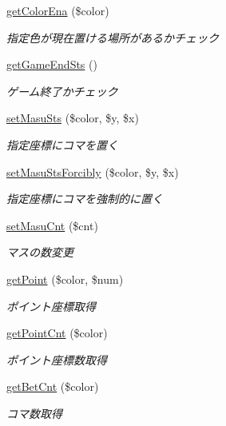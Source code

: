 \begin{DoxyCompactItemize}
\hyperlink{class_reversi_aead5ee041feb6ac2609266614ea06f78}{get\+Color\+Ena} (\$color)
\begin{DoxyCompactList}\small\item\em 指定色が現在置ける場所があるかチェック \end{DoxyCompactList}\item 
\hyperlink{class_reversi_aab9985c789e464de6cf99d7d725cb5a3}{get\+Game\+End\+Sts} ()
\begin{DoxyCompactList}\small\item\em ゲーム終了かチェック \end{DoxyCompactList}\item 
\hyperlink{class_reversi_a26f3168c7d94e70d344841d65885a4ac}{set\+Masu\+Sts} (\$color, \$y, \$x)
\begin{DoxyCompactList}\small\item\em 指定座標にコマを置く \end{DoxyCompactList}\item 
\hyperlink{class_reversi_ae659a2ce33e395f8d5cda5e62d03fe7e}{set\+Masu\+Sts\+Forcibly} (\$color, \$y, \$x)
\begin{DoxyCompactList}\small\item\em 指定座標にコマを強制的に置く \end{DoxyCompactList}\item 
\hyperlink{class_reversi_ab6853cc0f53e50a70d576f15296f0864}{set\+Masu\+Cnt} (\$cnt)
\begin{DoxyCompactList}\small\item\em マスの数変更 \end{DoxyCompactList}\item 
\hyperlink{class_reversi_ad059cc09b0001edd980f43770380b863}{get\+Point} (\$color, \$num)
\begin{DoxyCompactList}\small\item\em ポイント座標取得 \end{DoxyCompactList}\item 
\hyperlink{class_reversi_af538d04718f177f71461f582f3bd8eba}{get\+Point\+Cnt} (\$color)
\begin{DoxyCompactList}\small\item\em ポイント座標数取得 \end{DoxyCompactList}\item 
\hyperlink{class_reversi_acb1491c467c3065beece256256f5f59d}{get\+Bet\+Cnt} (\$color)
\begin{DoxyCompactList}\small\item\em コマ数取得 \end{DoxyCompactList}\item 

\end{DoxyCompactItemize}
